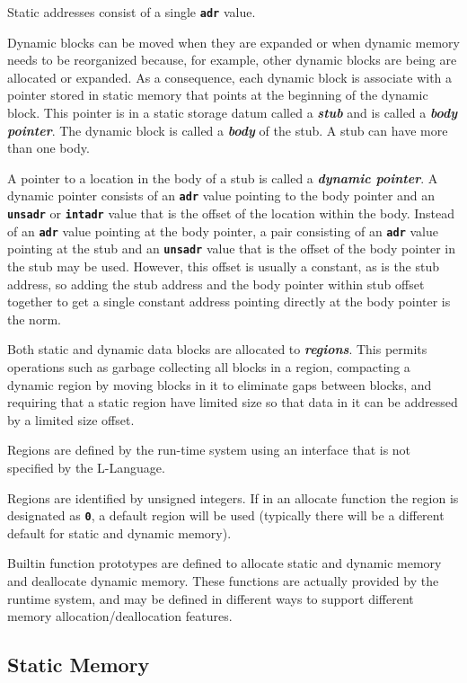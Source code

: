 \documentclass[12pt]{article}
\newcommand{\TT}[1]{{\tt \bfseries #1}}
\newcommand{\key}[1]{{\bf \em #1}\index{#1}}
\newcommand{\skey}[2]{{\bf \em #1#2}\index{#1}}
\begin{document}
Static addresses consist of a single \TT{adr} value.

Dynamic blocks can be moved when they are expanded or when dynamic
memory needs to be reorganized because, for example, other dynamic
blocks are being are allocated or expanded.  As a consequence,
each dynamic block is associate with a pointer stored in static
memory that points at the beginning of the dynamic block.  This
pointer is in a static storage datum called a \key{stub}
and is called a \key{body pointer}.  The dynamic block is called
a \key{body} of the stub.  A stub can have more than one body.

A pointer to a location in the body of a stub is called
a \key{dynamic pointer}.  A dynamic pointer
consists of an \TT{adr} value
pointing to the body pointer and an \TT{unsadr} or \TT{intadr}
value that is the offset of the location within the body.
Instead of an \TT{adr} value pointing at the body pointer, a pair consisting
of an \TT{adr} value pointing at the stub and an \TT{unsadr} value
that is the offset of the body pointer in the stub may be used.  However,
this offset is usually a constant, as is the stub address,
so adding the stub address and the
body pointer within stub offset together to get a single constant
address pointing directly at the body pointer is the norm.

Both static and dynamic data blocks are allocated to \skey{region}s.
This permits operations such as garbage collecting all blocks in a
region, compacting a dynamic region by moving blocks in it to eliminate
gaps between blocks, and requiring that a static region have limited size
so that data in it can be addressed by a limited size offset.

Regions are defined by the run-time system using an interface that
is not specified by the L-Language.

Regions are identified by unsigned integers.  If in an allocate function
the region is designated as \TT{0}, a default region will be used
(typically there will be a different default for static and dynamic
memory).

Builtin function prototypes are defined to allocate static and dynamic memory
and deallocate dynamic memory.  These functions are actually provided
by the runtime system, and may be defined in different ways to support
different memory allocation/deallocation features.

\subsection{Static Memory}
\label{STATIC-MEMORY}
\end{document}

